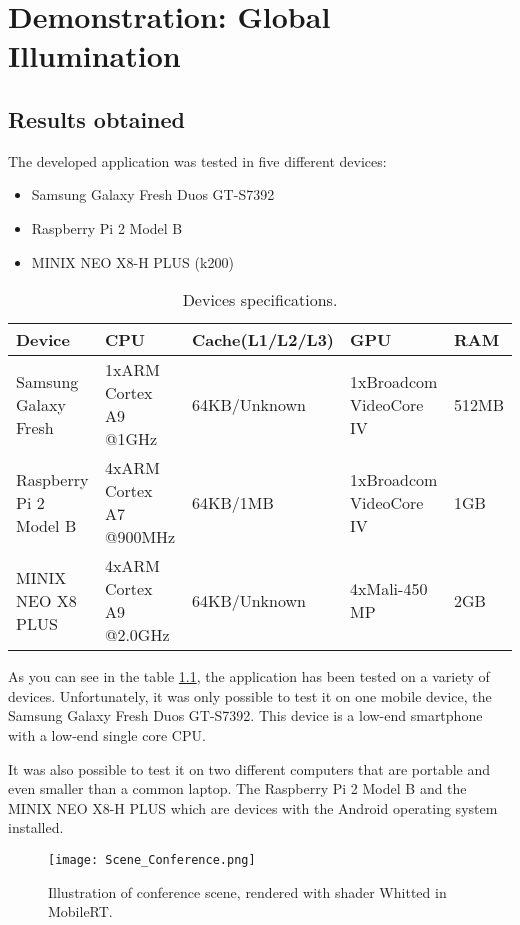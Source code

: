 \chapter{Demonstration: Global Illumination}

\section{Results obtained}
\label{ResultsObtained}

\par
The developed application was tested in five different devices:

\begin{itemize}
	\item Samsung Galaxy Fresh Duos GT-S7392
	\item Raspberry Pi 2 Model B
	\item MINIX NEO X8-H PLUS (k200)
\end{itemize}

\begin{table}[H]
	\small
	\centering
	\caption{Devices specifications.}
	\label{specs}
	\hspace*{-2cm}
	\begin{tabular}{|l|l|l|l|l|}
		\hline
		Device&CPU&Cache(L1/L2/L3)&GPU&RAM\\ \hline
		Samsung Galaxy Fresh&1xARM Cortex A9 @1GHz&64KB/Unknown&1xBroadcom VideoCore IV&512MB\\ \hline
		Raspberry Pi 2 Model B&4xARM Cortex A7 @900MHz&64KB/1MB&1xBroadcom VideoCore IV&1GB\\ \hline
		MINIX NEO X8 PLUS&4xARM Cortex A9 @2.0GHz&64KB/Unknown&4xMali-450 MP&2GB\\ \hline
	\end{tabular}
\end{table}

\par
As you can see in the table \ref{specs}, the application has been tested on a variety of devices.
Unfortunately, it was only possible to test it on one mobile device, the Samsung Galaxy Fresh Duos GT-S7392.
This device is a low-end smartphone with a low-end single core CPU.

\par
It was also possible to test it on two different computers that are portable and even smaller than a common laptop.
The Raspberry Pi 2 Model B and the MINIX NEO X8-H PLUS which are devices with the Android operating system installed.

\begin{figure}[H]
	\centering
	\caption{Illustration of conference scene, rendered with shader Whitted in MobileRT.}
	\label{scene_conference}
	\texttt{[image: Scene\_Conference.png]}
\end{figure}

